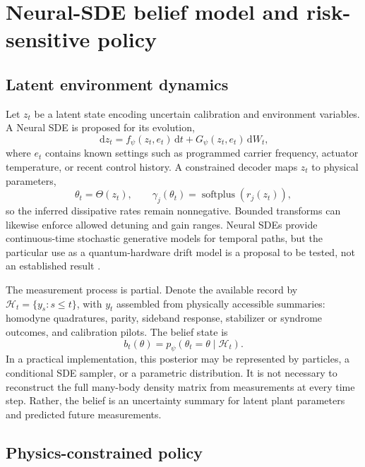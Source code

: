 \documentclass[10pt,twoside]{article}
\newcommand{\dd}{\,\mathrm d}
\begin{document}
\section{Neural-SDE belief model and risk-sensitive policy}

\subsection{Latent environment dynamics}

Let $z_t$ be a latent state encoding uncertain calibration and environment variables. A Neural SDE is proposed for its evolution,
\begin{equation}
\dd z_t=f_\psi(z_t,e_t)\dd t+G_\psi(z_t,e_t)\dd W_t,
\label{eq:neuralsde}
\end{equation}
where $e_t$ contains known settings such as programmed carrier frequency, actuator temperature, or recent control history. A constrained decoder maps $z_t$ to physical parameters,
\begin{equation}
\theta_t=\Theta(z_t),\qquad \gamma_j(\theta_t)=\operatorname{softplus}(r_j(z_t)),
\end{equation}
so the inferred dissipative rates remain nonnegative. Bounded transforms can likewise enforce allowed detuning and gain ranges. Neural SDEs provide continuous-time stochastic generative models for temporal paths, but the particular use as a quantum-hardware drift model is a proposal to be tested, not an established result \citep{kidger2021neuralsde}.

The measurement process is partial. Denote the available record by $\mathcal H_t=\{y_s:s\leq t\}$, with $y_t$ assembled from physically accessible summaries: homodyne quadratures, parity, sideband response, stabilizer or syndrome outcomes, and calibration pilots. The belief state is
\begin{equation}
b_t(\theta)=p_\psi(\theta_t=\theta\mid\mathcal H_t).
\label{eq:belief}
\end{equation}
In a practical implementation, this posterior may be represented by particles, a conditional SDE sampler, or a parametric distribution. It is not necessary to reconstruct the full many-body density matrix from measurements at every time step. Rather, the belief is an uncertainty summary for latent plant parameters and predicted future measurements.

\subsection{Physics-constrained policy}
\end{document}
